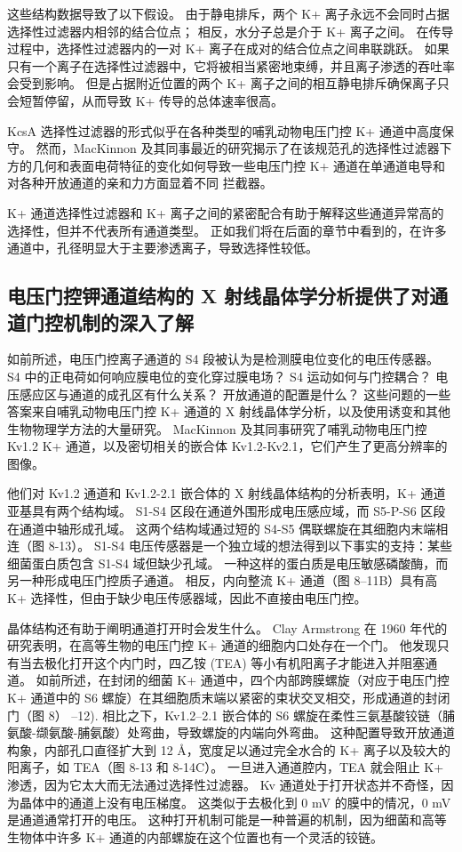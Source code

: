 这些结构数据导致了以下假设。 由于静电排斥，两个 K+ 离子永远不会同时占据选择性过滤器内相邻的结合位点； 相反，水分子总是介于 K+ 离子之间。 在传导过程中，选择性过滤器内的一对 K+ 离子在成对的结合位点之间串联跳跃。 如果只有一个离子在选择性过滤器中，它将被相当紧密地束缚，并且离子渗透的吞吐率会受到影响。 但是占据附近位置的两个 K+ 离子之间的相互静电排斥确保离子只会短暂停留，从而导致 K+ 传导的总体速率很高。

KcsA 选择性过滤器的形式似乎在各种类型的哺乳动物电压门控 K+ 通道中高度保守。 然而，MacKinnon 及其同事最近的研究揭示了在该规范孔的选择性过滤器下方的几何和表面电荷特征的变化如何导致一些电压门控 K+ 通道在单通道电导和对各种开放通道的亲和力方面显着不同 拦截器。

K+ 通道选择性过滤器和 K+ 离子之间的紧密配合有助于解释这些通道异常高的选择性，但并不代表所有通道类型。 正如我们将在后面的章节中看到的，在许多通道中，孔径明显大于主要渗透离子，导致选择性较低。




\subsection{电压门控钾通道结构的 X 射线晶体学分析提供了对通道门控机制的深入了解}

如前所述，电压门控离子通道的 S4 段被认为是检测膜电位变化的电压传感器。 S4 中的正电荷如何响应膜电位的变化穿过膜电场？ S4 运动如何与门控耦合？ 电压感应区与通道的成孔区有什么关系？ 开放通道的配置是什么？ 这些问题的一些答案来自哺乳动物电压门控 K+ 通道的 X 射线晶体学分析，以及使用诱变和其他生物物理学方法的大量研究。 MacKinnon 及其同事研究了哺乳动物电压门控 Kv1.2 K+ 通道，以及密切相关的嵌合体 Kv1.2-Kv2.1，它们产生了更高分辨率的图像。

他们对 Kv1.2 通道和 Kv1.2-2.1 嵌合体的 X 射线晶体结构的分析表明，K+ 通道亚基具有两个结构域。 S1-S4 区段在通道外围形成电压感应域，而 S5-P-S6 区段在通道中轴形成孔域。 这两个结构域通过短的 S4-S5 偶联螺旋在其细胞内末端相连（图 8-13）。 S1-S4 电压传感器是一个独立域的想法得到以下事实的支持：某些细菌蛋白质包含 S1-S4 域但缺少孔域。 一种这样的蛋白质是电压敏感磷酸酶，而另一种形成电压门控质子通道。 相反，内向整流 K+ 通道（图 8–11B）具有高 K+ 选择性，但由于缺少电压传感器域，因此不直接由电压门控。

晶体结构还有助于阐明通道打开时会发生什么。 Clay Armstrong 在 1960 年代的研究表明，在高等生物的电压门控 K+ 通道的细胞内口处存在一个门。 他发现只有当去极化打开这个内门时，四乙铵 (TEA) 等小有机阳离子才能进入并阻塞通道。 如前所述，在封闭的细菌 K+ 通道中，四个内部跨膜螺旋（对应于电压门控 K+ 通道中的 S6 螺旋）在其细胞质末端以紧密的束状交叉相交，形成通道的封闭门（图 8） –12). 相比之下，Kv1.2–2.1 嵌合体的 S6 螺旋在柔性三氨基酸铰链（脯氨酸-缬氨酸-脯氨酸）处弯曲，导致螺旋的内端向外弯曲。 这种配置导致开放通道构象，内部孔口直径扩大到 12 Å，宽度足以通过完全水合的 K+ 离子以及较大的阳离子，如 TEA（图 8-13 和 8-14C）。 一旦进入通道腔内，TEA 就会阻止 K+ 渗透，因为它太大而无法通过选择性过滤器。 Kv 通道处于打开状态并不奇怪，因为晶体中的通道上没有电压梯度。 这类似于去极化到 0 mV 的膜中的情况，0 mV 是通道通常打开的电压。 这种打开机制可能是一种普遍的机制，因为细菌和高等生物体中许多 K+ 通道的内部螺旋在这个位置也有一个灵活的铰链。

